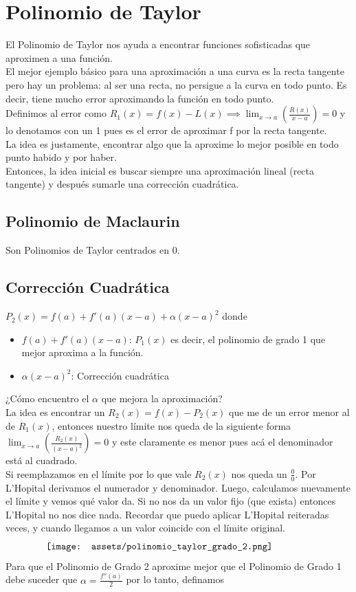 \documentclass[10pt,a4paper]{article}
\begin{document}
\section*{Polinomio de Taylor}
El Polinomio de Taylor nos ayuda a encontrar funciones sofisticadas que aproximen a una función. \\
El mejor ejemplo básico para una aproximación a una curva es la recta tangente pero hay un problema: al ser una recta, no persigue a la curva en todo punto. Es decir, tiene mucho error aproximando la función en todo punto. \\
Definimos al error como $R_{1}(x) = f(x) - L(x) \implies \lim_{x \to a} \left(\frac{R(x)}{x-a}  \right) = 0 $ y lo denotamos con un 1 pues es el error de aproximar f por la recta tangente. \\
La idea es justamente, encontrar algo que la aproxime lo mejor posible en todo punto habido y por haber. \\
Entonces, la idea inicial es buscar siempre una aproximación lineal (recta tangente) y después sumarle una corrección cuadrática.
\subsection*{Polinomio de Maclaurin}
Son Polinomios de Taylor centrados en 0.
\subsection*{Corrección Cuadrática}
$P_{2}(x) = f(a) + f'(a)(x-a) + \alpha(x-a)^{2}$
donde 
\begin{itemize}
    \item $f(a) + f'(a)(x-a)$: $P_{1}(x)$ es decir, el polinomio de grado 1 que mejor aproxima a la función.
    \item $\alpha(x-a)^{2}$: Corrección cuadrática
\end{itemize}
¿Cómo encuentro el $\alpha$ que mejora la aproximación? \\
La idea es encontrar un $R_{2}(x) = f(x) - P_{2}(x)$ que me de un error menor al de $R_{1}(x)$, entonces nuestro límite nos queda de la siguiente forma $\lim_{x \to a} \left(\frac{R_{2}(x)}{(x-a)^{2}}  \right) = 0$ y este claramente es menor pues acá el denominador está al cuadrado. \\
Si reemplazamos en el límite por lo que vale $R_{2}(x)$ nos queda un $\frac{0}{0}$. Por L'Hopital derivamos el numerador y denominador. Luego, calculamos nuevamente el límite y vemos qué valor da. Si no nos da un valor fijo (que exista) entonces L'Hopital no nos dice nada. Recordar que puedo aplicar L'Hopital reiteradas veces, y cuando llegamos a un valor coincide con el límite original.
\[\begin{minipage}[b]{0.8\textwidth}
    \texttt{[image: assets/polinomio\_taylor\_grado\_2.png]}
\end{minipage}\]
Para que el Polinomio de Grado 2 aproxime mejor que el Polinomio de Grado 1 debe suceder que $\alpha = \frac{f''(a)}{2}$ por lo tanto, definamos 
\end{document}
